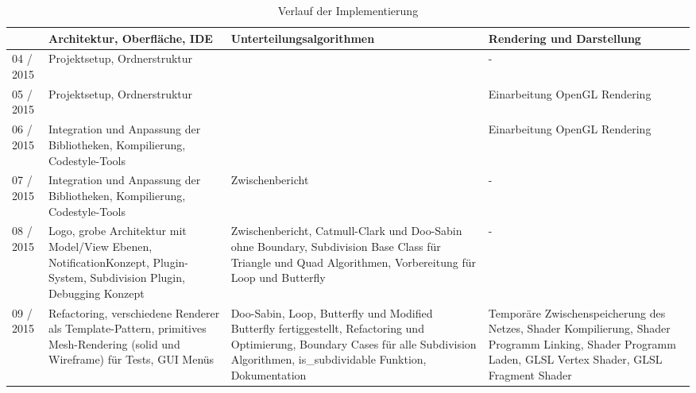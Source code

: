 \begin{table}[]
\vspace*{-35mm}

\center
\caption{Verlauf der Implementierung}

\hspace*{-24mm}
\begin{tabular}{|p{1.6cm}|p{5cm}|p{5cm}|p{5cm}|}
\hline
		  
		  & Architektur, Oberfläche, IDE
      	  & Unterteilungsalgorithmen
      	  & Rendering und Darstellung
      	  \\
    	  
\hline
          
04 / 2015 & Projektsetup, Ordnerstruktur 
          & 
          & -
      	  \\
         
\hline

05 / 2015 & Projektsetup, Ordnerstruktur
		  & 
		  & Einarbeitung OpenGL Rendering
		  \\
		  
\hline

06 / 2015 & Integration und Anpassung
			der Bibliotheken, Kompilierung,
			Codestyle-Tools
		  &
		  & Einarbeitung OpenGL Rendering
		  \\
		  
\hline

07 / 2015 & Integration und Anpassung
			der Bibliotheken, Kompilierung,
			Codestyle-Tools
		  & Zwischenbericht
		  & -
		  \\
		  
\hline

08 / 2015 & Logo, grobe Architektur mit
			Model/View Ebenen,
			NotificationKonzept, Plugin-System,
			Subdivision Plugin, Debugging Konzept
          & Zwischenbericht, Catmull-Clark und Doo-Sabin ohne Boundary,
			Subdivision Base Class für Triangle und Quad Algorithmen,
			Vorbereitung für Loop und Butterfly
          & -
          \\
          
\hline

09 / 2015 & Refactoring, verschiedene Renderer
			als Template-Pattern, primitives
			Mesh-Rendering (solid und Wireframe)
			für Tests, GUI Menüs
		  & Doo-Sabin, Loop, Butterfly und Modified Butterfly fertiggestellt,
		  	Refactoring und Optimierung, Boundary Cases für alle Subdivision Algorithmen,
		  	is\_subdividable Funktion, Dokumentation
		  & Temporäre Zwischenspeicherung des Netzes,
		  	Shader Kompilierung, Shader Programm Linking,
		  	Shader Programm Laden, GLSL Vertex Shader,
		  	GLSL Fragment Shader
		  \\
		  

\end{tabular}
\end{table}
